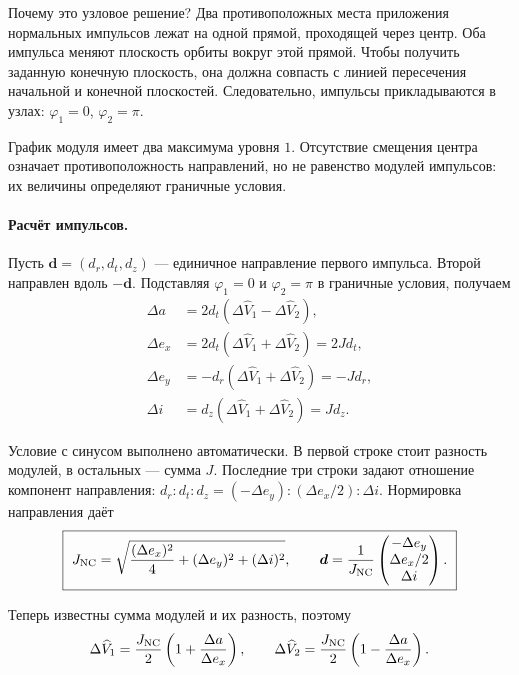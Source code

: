 Почему это узловое решение? Два противоположных места приложения
нормальных импульсов лежат на одной прямой, проходящей через центр.
Оба импульса меняют плоскость орбиты вокруг этой прямой.
Чтобы получить заданную конечную плоскость, она должна совпасть
с линией пересечения начальной и конечной плоскостей.
Следовательно, импульсы прикладываются в узлах:
$\varphi_1=0$, $\varphi_2=\pi$.

График модуля имеет два максимума уровня $1$. Отсутствие смещения
центра означает противоположность направлений, но не равенство
модулей импульсов: их величины определяют граничные условия.



\paragraph{Расчёт импульсов.}
Пусть $\boldsymbol d=(d_r,d_t,d_z)$ --- единичное направление
первого импульса. Второй направлен вдоль $-\boldsymbol d$.
Подставляя $\varphi_1=0$ и $\varphi_2=\pi$ в граничные условия, получаем
\begin{equation}
\begin{aligned}
 \Delta a&=2d_t(\Delta\widehat V_1-\Delta\widehat V_2),\\
 \Delta e_x&=2d_t(\Delta\widehat V_1+\Delta\widehat V_2)=2Jd_t,\\
 \Delta e_y&=-d_r(\Delta\widehat V_1+\Delta\widehat V_2)=-Jd_r,\\
 \Delta i&=d_z(\Delta\widehat V_1+\Delta\widehat V_2)=Jd_z.
\end{aligned}
\label{eq:nc-balances}
\end{equation}

Условие с синусом выполнено автоматически.
В первой строке стоит разность модулей, в остальных --- сумма $J$.
Последние три строки задают отношение компонент направления:
$d_r:d_t:d_z=(-\Delta e_y): (\Delta e_x/2):\Delta i$.
Нормировка направления даёт
\begin{equation}
 \boxed{\ J_{\rm NC}=\sqrt{\frac{(\Delta e_x)^2}{4}+(\Delta e_y)^2+(\Delta i)^2},
 \qquad \boldsymbol d=\frac{1}{J_{\rm NC}}
       \begin{pmatrix}-\Delta e_y\\\Delta e_x/2\\\Delta i\end{pmatrix}.\ }
 \label{eq:nc-cost}
\end{equation}

Теперь известны сумма модулей и их разность, поэтому
\begin{equation}
 \Delta\widehat V_1=\frac{J_{\rm NC}}2\left(1+\frac{\Delta a}{\Delta e_x}\right),
 \qquad
 \Delta\widehat V_2=\frac{J_{\rm NC}}2\left(1-\frac{\Delta a}{\Delta e_x}\right).
 \label{eq:nc-magnitudes}
\end{equation}

